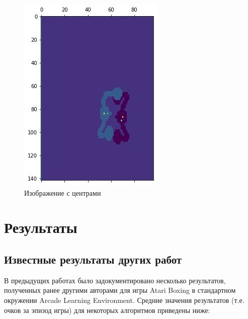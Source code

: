 \documentclass{letask}
\begin{document}
\begin{figure}[H]
\begin{center}
\begin{minipage}[h]{0.4\linewidth}
\includegraphics[width=1\linewidth]{observation_final.jpg}
\caption{Изображение с центрами}
\label{observation_final}
\end{minipage}
\end{center}
\end{figure}

\section{Результаты}

\subsection{Известные результаты других работ}

В предыдущих работах было задокументировано несколько результатов, полученных ранее другими авторами для игры Atari Boxing в стандартном окружении Arcade Learning Environment. Средние значения результатов (т.е. очков за эпизод игры) для некоторых алгоритмов приведены ниже:
\end{document}
